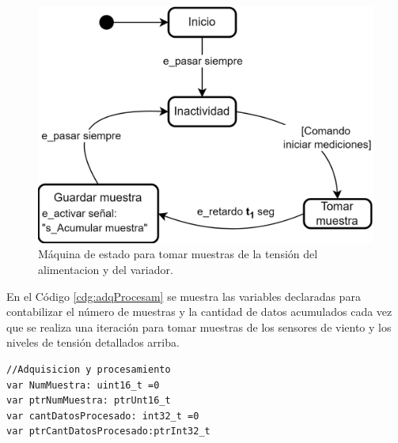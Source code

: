 

\begin{figure}[H]
    \centering
    \includegraphics[width=0.6\linewidth]{Figuras/datalogger/Firmware/sc_sampleSensorVoltage.png}
    \caption{Máquina de estado para tomar muestras de la tensión del alimentacion y del variador.}
    \label{fig:sc_sampleSensorVoltage}
\end{figure}

En el Código \ref{cdg:adqProcesam} se muestra las variables declaradas para contabilizar el número de muestras y la cantidad de datos acumulados cada vez que se realiza una iteración para tomar muestras de los sensores de viento y los niveles de tensión detallados arriba. 


\begin{lstlisting}[style=yakindustyle, caption={Varibles para controlar la adquisición y procesamiento de los datos .}, label=cdg:adqProcesam,basicstyle=\ttfamily\fontsize{8}{8}\selectfont]
//Adquisicion y procesamiento
var NumMuestra: uint16_t =0
var ptrNumMuestra: ptrUnt16_t
var cantDatosProcesado: int32_t =0
var ptrCantDatosProcesado:ptrInt32_t
\end{lstlisting}

